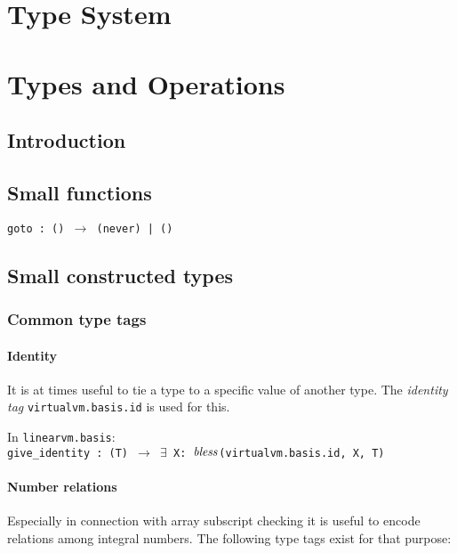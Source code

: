 \documentclass[a4paper]{book}
\newcommand\tyBless{{\ensuremath{\textnormal{\textit{bless}}}}}
\begin{document}


\part{Type System}


\part{Types and Operations}

\chapter{Introduction}
\chapter{Small functions}

\texttt{goto : () $\to$ (never) | ()}

\chapter{Small constructed types}

\section{Common type tags}

\subsection*{Identity}
It is at times useful to tie a type to a specific value of another type.
The \emph{identity tag} \texttt{virtualvm.basis.id} is used for this.

In \texttt{linearvm.basis}:\\
\texttt{give\_identity : (T) $\to$ $\exists$ X: \tyBless(virtualvm.basis.id, X, T)}

\subsection*{Number relations}
Especially in connection with array subscript checking it is useful to encode
relations among integral numbers.
The following type tags exist for that purpose:
\end{document}
